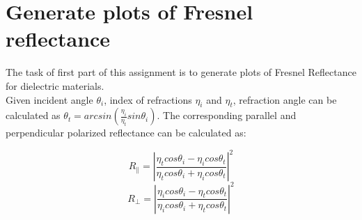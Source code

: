 \documentclass[12pt,twoside]{article}
\begin{document}


\section{Generate plots of Fresnel reflectance}
    The task of first part of this assignment is to generate plots of Fresnel Reflectance for dielectric materials. \\
    Given incident angle $\theta_i$, index of refractions $\eta_i$ and $\eta_t$, refraction angle can be calculated as $\theta_t = arcsin(\frac{\eta_i}{\eta_t}sin\theta_i)$. The corresponding parallel and perpendicular polarized reflectance can be calculated as:
    
        $$R_{\parallel} = |\frac{\eta_tcos\theta_i-\eta_icos\theta_t}{\eta_tcos\theta_i+\eta_icos\theta_t}|^2$$
        $$R_{\bot} = |\frac{\eta_icos\theta_i-\eta_tcos\theta_t}{\eta_icos\theta_i+\eta_tcos\theta_t}|^2$$
        
\end{document}
